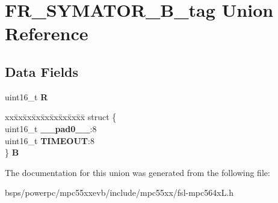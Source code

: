 \hypertarget{unionFR__SYMATOR__16B__tag}{}\section{F\+R\+\_\+\+S\+Y\+M\+A\+T\+O\+R\+\_\+B\+\_\+tag Union Reference}
\label{unionFR__SYMATOR__16B__tag}
\subsection*{Data Fields}
\begin{DoxyCompactItemize}
\item 
\mbox{\label{unionFR__SYMATOR__16B__tag_aa89001cd4dd0a7effe66dea275ab3dae}} 
uint16\+\_\+t {\bfseries R}
\item 
\mbox{\label{unionFR__SYMATOR__16B__tag_ab0d9518f19e01a446ea67b645d34eaf0}} 
\begin{tabbing}
xx\=xx\=xx\=xx\=xx\=xx\=xx\=xx\=xx\=\kill
struct \{\\
\>uint16\_t {\bfseries \_\_pad0\_\_}:8\\
\>uint16\_t {\bfseries TIMEOUT}:8\\
\} {\bfseries B}\\

\end{tabbing}\end{DoxyCompactItemize}


The documentation for this union was generated from the following file\+:\begin{DoxyCompactItemize}
\item 
bsps/powerpc/mpc55xxevb/include/mpc55xx/fsl-\/mpc564x\+L.\+h\end{DoxyCompactItemize}
